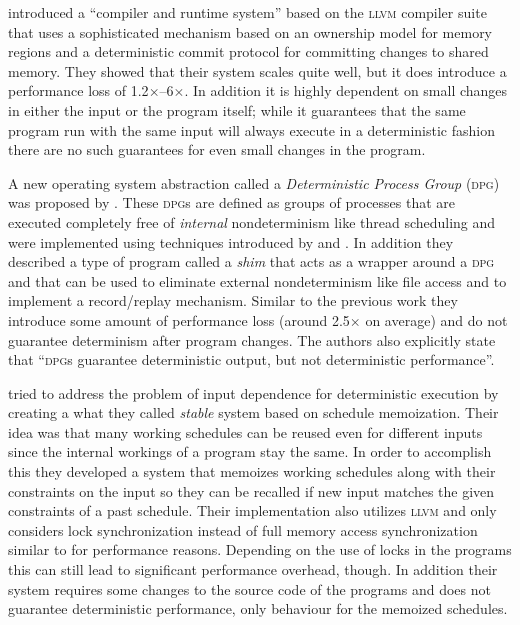 \citet{bergan_coredet:_2010} introduced a ``compiler and runtime system''
based on the \textsc{llvm} compiler suite that uses a sophisticated mechanism
based on an ownership model for memory regions and a deterministic commit
protocol for committing changes to shared memory. They showed that their
system scales quite well, but it does introduce a performance loss of
1.2$\times$--6$\times$. In addition it is highly dependent on small changes in
either the input or the program itself; while it guarantees that the same
program run with the same input will always execute in a deterministic fashion
there are no such guarantees for even small changes in the program.

A new operating system abstraction called a \emph{Deterministic Process Group}
(\textsc{dpg}) was proposed by \citet{bergan_deterministic_2010}. These
\textsc{dpg}s are defined as groups of processes that are executed completely
free of \emph{internal} nondeterminism like thread scheduling and were
implemented using techniques introduced by \citet{devietti_dmp:_2009} and
\citet{bergan_coredet:_2010}. In addition they described a type of program
called a \emph{shim} that acts as a wrapper around a \textsc{dpg} and that can
be used to eliminate external nondeterminism like file access and to implement
a record\slash replay mechanism. Similar to the previous work they introduce
some amount of performance loss (around 2.5$\times$ on average) and do not
guarantee determinism after program changes. The authors also explicitly state
that ``\textsc{dpg}s guarantee deterministic output, but not deterministic
performance''.

\citet{cui_stable_2010} tried to address the problem of input dependence for
deterministic execution by creating a what they called \emph{stable} system
based on schedule memoization. Their idea was that many working schedules can
be reused even for different inputs since the internal workings of a program
stay the same. In order to accomplish this they developed a system that
memoizes working schedules along with their constraints on the input so they
can be recalled if new input matches the given constraints of a past schedule.
Their implementation also utilizes \textsc{llvm} and only considers lock
synchronization instead of full memory access synchronization similar to
\citet{olszewski_kendo:_2009} for performance reasons. Depending on the use of
locks in the programs this can still lead to significant performance overhead,
though. In addition their system requires some changes to the source code of
the programs and does not guarantee deterministic performance, only behaviour
for the memoized schedules.

